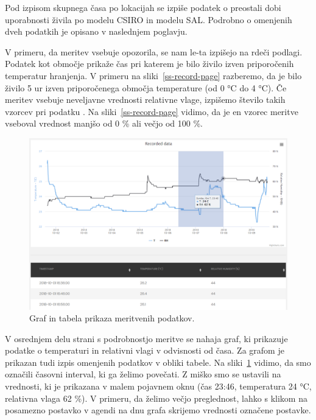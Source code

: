 \documentclass[a4paper, 12pt]{book}
\begin{document}
Pod izpisom skupnega časa po lokacijah se izpiše podatek o preostali dobi uporabnosti živila po modelu CSIRO in modelu SAL. Podrobno o omenjenih dveh podatkih je opisano v naslednjem poglavju.

V primeru, da meritev vsebuje opozorila, se nam le-ta izpišejo na rdeči podlagi. Podatek  kot območje prikaže čas pri katerem je bilo živilo izven priporočenih temperatur hranjenja. V primeru na sliki~\ref{ss-record-page} razberemo, da je bilo živilo 5 ur izven priporočenega območja temperature (od 0 °C do 4 °C). 
Če meritev vsebuje neveljavne vrednosti relativne vlage, izpišemo število takih vzorcev pri podatku . Na sliki~\ref{ss-record-page} vidimo, da je en vzorec meritve vseboval vrednost manjšo od 0 \% ali večjo od 100 \%.


\begin{figure}[h]
\begin{center}
\includegraphics[width=\textwidth]{slike/record_page_2_zoom.png}
\end{center}
\caption{Graf in tabela prikaza meritvenih podatkov.}
\label{ss-record-page-zoom}
\end{figure}

V osrednjem delu strani s podrobnostjo meritve se nahaja graf, ki prikazuje podatke o temperaturi in relativni vlagi v odvisnosti od časa. Za grafom je prikazan tudi izpis omenjenih podatkov v obliki tabele.
Na sliki~\ref{ss-record-page-zoom} vidimo, da smo označili časovni interval, ki ga želimo povečati. Z miško smo se ustavili na vrednosti, ki je prikazana v malem pojavnem oknu (čas 23:46, temperatura 24 °C, relativna vlaga 62 \%). V primeru, da želimo večjo preglednost, lahko s klikom na posamezno postavko v agendi na dnu grafa skrijemo vrednosti označene postavke.  
\end{document}
